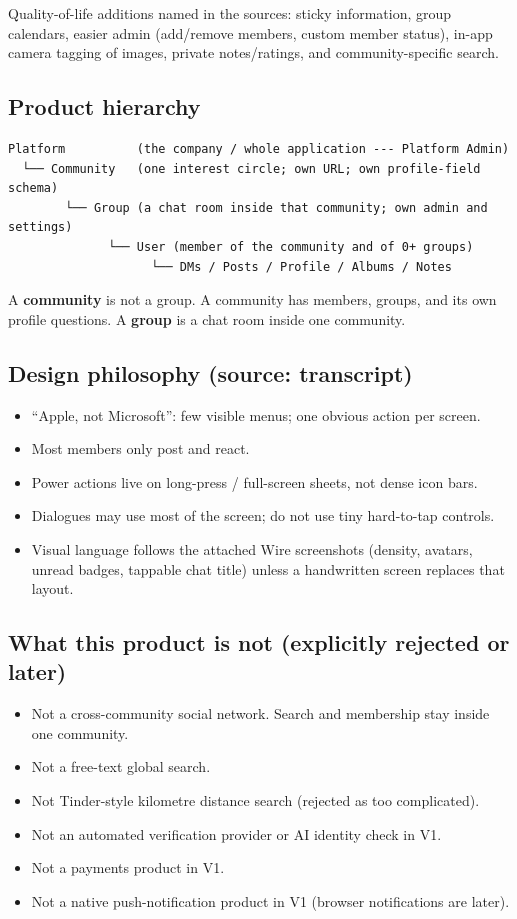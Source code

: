 \documentclass[11pt,a4paper]{article}
\begin{document}
Quality-of-life additions named in the sources: sticky information, group calendars, easier admin (add/remove members, custom member status), in-app camera tagging of images, private notes/ratings, and community-specific search.

\subsection{Product hierarchy}
\begin{verbatim}
Platform          (the company / whole application --- Platform Admin)
  └── Community   (one interest circle; own URL; own profile-field schema)
        └── Group (a chat room inside that community; own admin and settings)
              └── User (member of the community and of 0+ groups)
                    └── DMs / Posts / Profile / Albums / Notes
\end{verbatim}

A \textbf{community} is not a group. A community has members, groups, and its own profile questions. A \textbf{group} is a chat room inside one community.

\subsection{Design philosophy (source: transcript)}
\begin{itemize}
  \item ``Apple, not Microsoft'': few visible menus; one obvious action per screen.
  \item Most members only post and react.
  \item Power actions live on long-press / full-screen sheets, not dense icon bars.
  \item Dialogues may use most of the screen; do not use tiny hard-to-tap controls.
  \item Visual language follows the attached Wire screenshots (density, avatars, unread badges, tappable chat title) unless a handwritten screen replaces that layout.
\end{itemize}

\subsection{What this product is not (explicitly rejected or later)}
\begin{itemize}
  \item Not a cross-community social network. Search and membership stay inside one community.
  \item Not a free-text global search.
  \item Not Tinder-style kilometre distance search (rejected as too complicated).
  \item Not an automated verification provider or AI identity check in V1.
  \item Not a payments product in V1.
  \item Not a native push-notification product in V1 (browser notifications are later).
\end{itemize}
\end{document}
